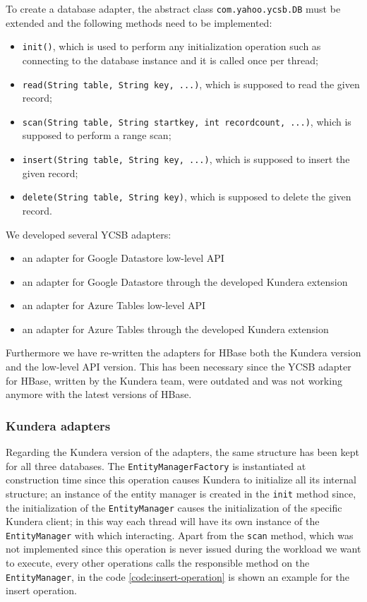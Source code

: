 \noindent To create a database adapter, the abstract class \texttt{com.yahoo.ycsb.DB} must be extended and the following methods need to be implemented:
\begin{itemize}
\item \texttt{init()}, which is used to perform any initialization operation such as connecting to the database instance and it is called once per thread;
\item \texttt{read(String table, String key, ...)}, which is supposed to read the given record;
\item \texttt{scan(String table, String startkey, int recordcount, ...)}, which is supposed to perform a range scan;
\item \texttt{insert(String table, String key, ...)}, which is supposed to insert the given record;
\item \texttt{delete(String table, String key)}, which is supposed to delete the given record.
\end{itemize}

\newparagraph We developed  several YCSB adapters:
\begin{itemize}
\item an adapter for Google Datastore low-level API
\item an adapter for Google Datastore through the developed Kundera extension
\item an adapter for Azure Tables low-level API
\item an adapter for Azure Tables through the developed Kundera extension
\end{itemize}
\noindent Furthermore we have re-written the adapters for HBase both the Kundera version and the low-level API version. This has been necessary since the YCSB adapter for HBase, written by the Kundera team, were outdated and was not working anymore with the latest versions of HBase.

\subsubsection{Kundera adapters}
Regarding the Kundera version of the adapters, the same structure has been kept for all three databases. The \texttt{EntityManagerFactory} is instantiated at construction time since this operation causes Kundera to initialize all its internal structure; an instance of the entity manager is created in the \texttt{init} method since, the initialization of the \texttt{EntityManager} causes the initialization of the specific Kundera client; in this way each thread will have its own instance of the \texttt{EntityManager} with which interacting.
Apart from the \texttt{scan} method, which was not implemented since this operation is never issued during the workload we want to execute, every other operations calls the responsible method on the \texttt{EntityManager}, in the code \ref{code:insert-operation} is shown an example for the insert operation.

